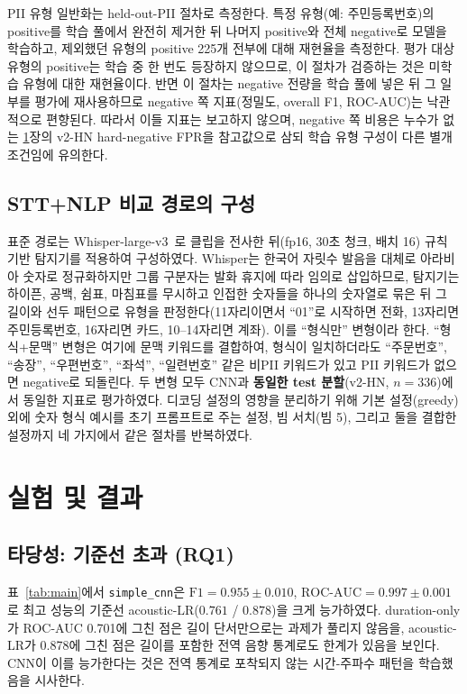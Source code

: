 \documentclass[11pt]{article}
\renewcommand{\emph}[1]{\textbf{#1}}
\begin{document}
PII 유형 일반화는 held-out-PII 절차로 측정한다. 특정 유형(예: 주민등록번호)의 positive를
학습 풀에서 완전히 제거한 뒤 나머지 positive와 전체 negative로 모델을 학습하고, 제외했던
유형의 positive 225개 전부에 대해 재현율을 측정한다. 평가 대상 유형의 positive는 학습 중 한
번도 등장하지 않으므로, 이 절차가 검증하는 것은 미학습 유형에 대한 재현율이다. 반면 이
절차는 negative 전량을 학습 풀에 넣은 뒤 그 일부를 평가에 재사용하므로 negative 쪽
지표(정밀도, overall F1, ROC-AUC)는 낙관적으로 편향된다. 따라서 이들 지표는 보고하지 않으며,
negative 쪽 비용은 누수가 없는 \ref{sec:exp}장의 v2-HN hard-negative FPR을 참고값으로 삼되
학습 유형 구성이 다른 별개 조건임에 유의한다.

\subsection{STT+NLP 비교 경로의 구성}
표준 경로는 Whisper-large-v3~\cite{radford2023whisper}로 클립을 전사한 뒤(fp16, 30초 청크,
배치 16) 규칙 기반 탐지기를 적용하여 구성하였다. Whisper는 한국어 자릿수 발음을 대체로
아라비아 숫자로 정규화하지만 그룹 구분자는 발화 휴지에 따라 임의로 삽입하므로, 탐지기는
하이픈, 공백, 쉼표, 마침표를 무시하고 인접한 숫자들을 하나의 숫자열로 묶은 뒤 그 길이와
선두 패턴으로 유형을 판정한다(11자리이면서 ``01''로 시작하면 전화, 13자리면 주민등록번호,
16자리면 카드, 10--14자리면 계좌). 이를 ``형식만'' 변형이라 한다. ``형식+문맥'' 변형은
여기에 문맥 키워드를 결합하여, 형식이 일치하더라도 ``주문번호'', ``송장'', ``우편번호'',
``좌석'', ``일련번호'' 같은 비PII 키워드가 있고 PII 키워드가 없으면 negative로 되돌린다.
두 변형 모두 CNN과 \emph{동일한 test 분할}(v2-HN, $n=336$)에서 동일한 지표로 평가하였다.
디코딩 설정의 영향을 분리하기 위해 기본 설정(greedy) 외에 숫자 형식 예시를 초기 프롬프트로
주는 설정, 빔 서치(빔 5), 그리고 둘을 결합한 설정까지 네 가지에서 같은 절차를 반복하였다.

\section{실험 및 결과}\label{sec:exp}

\subsection{타당성: 기준선 초과 (RQ1)}
표~\ref{tab:main}에서 \texttt{simple\_cnn}은 $\text{F1}=0.955\pm0.010$,
$\text{ROC-AUC}=0.997\pm0.001$로 최고 성능의 기준선 acoustic-LR($0.761$ / $0.878$)을 크게
능가하였다. duration-only가 ROC-AUC 0.701에 그친 점은 길이 단서만으로는 과제가 풀리지 않음을,
acoustic-LR가 0.878에 그친 점은 길이를 포함한 전역 음향 통계로도 한계가 있음을 보인다. CNN이
이를 능가한다는 것은 전역 통계로 포착되지 않는 시간-주파수 패턴을 학습했음을 시사한다.
\end{document}
